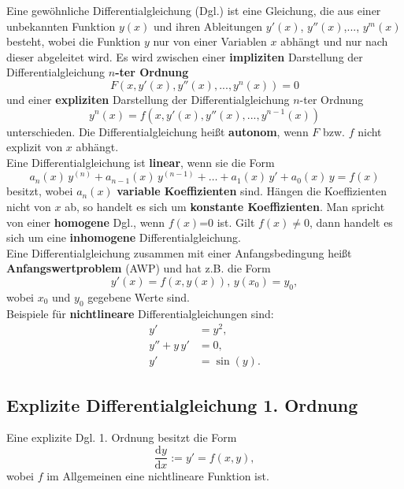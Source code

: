 Eine gew\"ohnliche Differentialgleichung (Dgl.) ist eine Gleichung, die aus einer unbekannten Funktion $y(x)$ und ihren Ableitungen $y'(x)$, $y''(x)$,..., $y^m(x)$ besteht, wobei die Funktion $y$ nur von einer Variablen $x$ abh\"angt und nur nach dieser abgeleitet wird. Es wird zwischen einer \textbf{impliziten} Darstellung der Differentialgleichung \textbf{$n$-ter Ordnung}
$$
F(x, y'(x), y''(x),..., y^n(x)) =0
$$
und einer \textbf{expliziten} Darstellung der Differentialgleichung $n$-ter Ordnung
$$
y^n(x) = f(x, y'(x), y''(x),..., y^{n-1}(x)) 
$$
unterschieden. Die Differentialgleichung hei\ss t \textbf{autonom}, wenn $F$ bzw. $f$ nicht explizit von $x$ abh\"angt. \\

\noindent
Eine Differentialgleichung ist \textbf{linear}, wenn sie die Form
$$
a_n(x)\, y^{(n)} + a_{n-1}(x)\, y^{(n-1)} + \dots + a_1(x)\, y' + a_0(x)\, y = f(x)
$$
besitzt, wobei $a_n(x)$ \textbf{variable Koeffizienten} sind. H\"angen die Koeffizienten nicht von $x$ ab, so handelt es sich um \textbf{konstante Koeffizienten}.
Man spricht von einer \textbf{homogene} Dgl., wenn $f(x)$=0 ist. Gilt $f(x) \neq 0$, dann handelt es sich um eine \textbf{inhomogene} Differentialgleichung.\\

\noindent
Eine Differentialgleichung zusammen mit einer Anfangsbedingung hei\ss t \textbf{Anfangswertproblem} (AWP) und hat z.B. die Form
$$
y'(x)=f(x,y(x)), \,  y(x_0) = y_0,
$$
wobei $x_0$ und $y_0$ gegebene Werte sind.\\

\noindent
Beispiele f\"ur \textbf{nichtlineare} Differentialgleichungen sind:
\begin{align*}
y' &= y^2, \\
y'' +y \, y' &= 0,\\
y' &= \sin(y).
\end{align*}

\subsection*{Explizite Differentialgleichung 1. Ordnung}
Eine explizite Dgl. 1. Ordnung besitzt die Form
$$
\dfrac{\mathrm{d}y}{\mathrm{d}x}:= y' = f(x,y),
$$
wobei $f$ im Allgemeinen eine nichtlineare Funktion ist. \\

